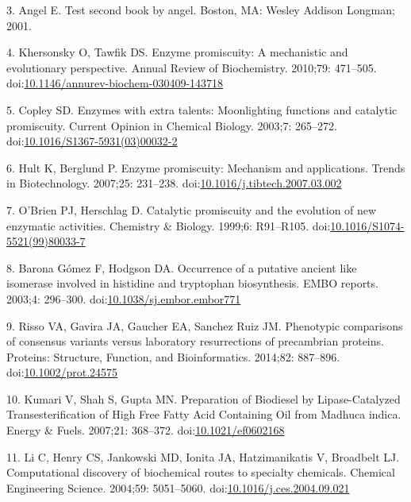 \documentclass[12pt,twoside]{reedthesis}
\begin{document}
  \hypertarget{ref-angel2002a}{}
  3. Angel E. Test second book by angel. Boston, MA: Wesley Addison
  Longman; 2001.
  
  \hypertarget{ref-khersonskyux5fenzymeux5f2010}{}
  4. Khersonsky O, Tawfik DS. Enzyme promiscuity: A mechanistic and
  evolutionary perspective. Annual Review of Biochemistry. 2010;79:
  471--505.
  doi:\href{https://doi.org/10.1146/annurev-biochem-030409-143718}{10.1146/annurev-biochem-030409-143718}
  
  \hypertarget{ref-copleyux5fenzymesux5f2003}{}
  5. Copley SD. Enzymes with extra talents: Moonlighting functions and
  catalytic promiscuity. Current Opinion in Chemical Biology. 2003;7:
  265--272.
  doi:\href{https://doi.org/10.1016/S1367-5931(03)00032-2}{10.1016/S1367-5931(03)00032-2}
  
  \hypertarget{ref-hultux5fenzymeux5f2007}{}
  6. Hult K, Berglund P. Enzyme promiscuity: Mechanism and applications.
  Trends in Biotechnology. 2007;25: 231--238.
  doi:\href{https://doi.org/10.1016/j.tibtech.2007.03.002}{10.1016/j.tibtech.2007.03.002}
  
  \hypertarget{ref-obrienux5fcatalyticux5f1999}{}
  7. O'Brien PJ, Herschlag D. Catalytic promiscuity and the evolution of
  new enzymatic activities. Chemistry \& Biology. 1999;6: R91--R105.
  doi:\href{https://doi.org/10.1016/S1074-5521(99)80033-7}{10.1016/S1074-5521(99)80033-7}
  
  \hypertarget{ref-baronagomezux5foccurrenceux5f2003}{}
  8. Barona Gómez F, Hodgson DA. Occurrence of a putative ancient like
  isomerase involved in histidine and tryptophan biosynthesis. EMBO
  reports. 2003;4: 296--300.
  doi:\href{https://doi.org/10.1038/sj.embor.embor771}{10.1038/sj.embor.embor771}
  
  \hypertarget{ref-rissoux5fphenotypicux5f2014}{}
  9. Risso VA, Gavira JA, Gaucher EA, Sanchez Ruiz JM. Phenotypic
  comparisons of consensus variants versus laboratory resurrections of
  precambrian proteins. Proteins: Structure, Function, and Bioinformatics.
  2014;82: 887--896.
  doi:\href{https://doi.org/10.1002/prot.24575}{10.1002/prot.24575}
  
  \hypertarget{ref-kumariux5fpreparationux5f2007}{}
  10. Kumari V, Shah S, Gupta MN. Preparation of Biodiesel by
  Lipase-Catalyzed Transesterification of High Free Fatty Acid Containing
  Oil from Madhuca indica. Energy \& Fuels. 2007;21: 368--372.
  doi:\href{https://doi.org/10.1021/ef0602168}{10.1021/ef0602168}
  
  \hypertarget{ref-liux5fcomputationalux5f2004}{}
  11. Li C, Henry CS, Jankowski MD, Ionita JA, Hatzimanikatis V, Broadbelt
  LJ. Computational discovery of biochemical routes to specialty
  chemicals. Chemical Engineering Science. 2004;59: 5051--5060.
  doi:\href{https://doi.org/10.1016/j.ces.2004.09.021}{10.1016/j.ces.2004.09.021}
  
\end{document}
